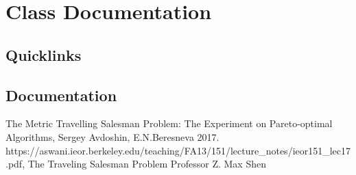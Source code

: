 \documentclass[10pt,a4paper]{article}
\begin{document}
\section{Class Documentation}

\subsection{Quicklinks}

\subsection{Documentation}




\normalsize
\begin{thebibliography}{9}

The Metric Travelling Salesman Problem:
The Experiment on Pareto-optimal
Algorithms,
Sergey Avdoshin, E.N.Beresneva
2017.
https://aswani.ieor.berkeley.edu/teaching/FA13/151/lecture\_notes/ieor151\_lec17.pdf,
The Traveling Salesman Problem
Professor Z. Max Shen

\end{thebibliography}
\end{document}
